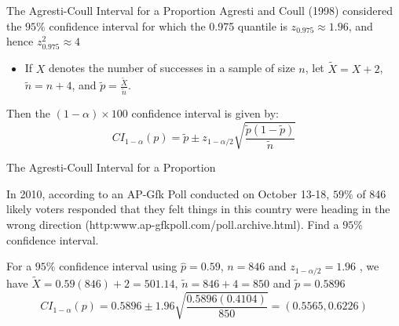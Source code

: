 \documentclass[
  ignorenonframetext,
]{beamer}
\providecommand{\tightlist}{%
  \setlength{\itemsep}{0pt}\setlength{\parskip}{0pt}}
\begin{document}
\begin{frame}{The Agresti-Coull Interval for a Proportion}
\protect\hypertarget{the-agresti-coull-interval-for-a-proportion}{}
Agresti and Coull (1998) considered the \(95\%\) confidence interval for
which the 0.975 quantile is \(z_{0.975}\approx1.96\), and hence
\(z^2_{0.975}\approx 4\)

\begin{itemize}
\tightlist
\item
  If \(X\) denotes the number of successes in a sample of size \(n\),
  let \(\tilde{X}=X+2\), \(\tilde{n}=n+4\), and
  \(\tilde{p}=\frac{\tilde{X}}{\tilde{n}}\).
\end{itemize}

Then the \((1-\alpha)\times 100\) confidence interval is given by:
\[CI_{1 - \alpha}(p) = \tilde{p}\pm z_{1-\alpha/2}\sqrt{\frac{\tilde{p}(1-\tilde{p})}{\tilde{n}}}\]
\end{frame}

\begin{frame}{The Agresti-Coull Interval for a Proportion}
\protect\hypertarget{the-agresti-coull-interval-for-a-proportion-1}{}
\begin{tcolorbox}
In 2010, according to an AP-Gfk Poll conducted on October 13-18, $59\%$ of 846 likely voters responded that they felt things in this country were heading in the wrong direction (http:www.ap-gfkpoll.com/poll.archive.html). Find a $95\%$ confidence interval. 
\end{tcolorbox}

\begin{tcolorbox}
For a $95\%$ confidence interval using $\hat{p}=0.59$, $n=846$ and $z_{1-\alpha/2}=1.96$ , we have $\tilde{X}=0.59(846)+2=501.14$, $\tilde{n}=846+4=850$ and $\tilde{p}=0.5896$
$$CI_{1 - \alpha}(p)=0.5896\pm 1.96\sqrt{\frac{0.5896(0.4104)}{850}}=(0.5565,0.6226)$$
\end{tcolorbox}
\end{frame}
\end{document}

